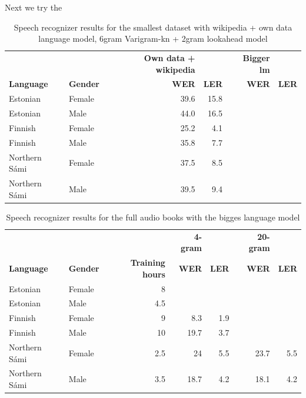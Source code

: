 \documentclass[b5paper]{article}
\newcommand{\ns}{{Northern Sámi }}
\begin{document}
Next we try the 

\begin{table}[!h]
\centering
\begin{tabular}{llrrrr}
 & & \textbf{Own data + wikipedia} & & \textbf{Bigger lm}\\
\textbf{Language} & \textbf{Gender} & \textbf{WER} & \textbf{LER}& \textbf{{WER}} & \textbf{LER}\\\hline
Estonian & Female & 39.6 & 15.8  & & \\
Estonian & Male & 44.0 & 16.5& & \\
Finnish & Female & 25.2 &4.1& &  \\
Finnish & Male &  35.8 & 7.7& &  \\
\ns & Female & 37.5 & 8.5 & & \\
\ns & Male & 39.5 & 9.4& &  \\
\end{tabular}
\caption{Speech recognizer results for the smallest dataset with wikipedia + own data language model, 6gram Varigram-kn + 2gram lookahead model \label{tbl:resultssmallcomp}}
\end{table}




\begin{table}[!h]
\centering
\begin{tabular}{llrrrrr}
& & & \textbf{4-gram} & & \textbf{20-gram} &\\
\textbf{Language} & \textbf{Gender} & \textbf{Training hours} & \textbf{WER} & \textbf{LER}& \textbf{{WER}} & \textbf{LER}\\\hline
Estonian & Female & 8 &  &  \\
Estonian & Male & 4.5 &  &   &  & \\
Finnish & Female & 9  & 8.3 & 1.9  &  & \\
Finnish & Male & 10  & 19.7 & 3.7  &  &  \\
\ns & Female & 2.5  & 24 & 5.5  & 23.7  & 5.5 \\
\ns & Male & 3.5   & 18.7 & 4.2  & 18.1  & 4.2 \\
\end{tabular}
\caption{Speech recognizer results for the full audio books with the bigges language model \label{tbl:resultbigcomp}}
\end{table}
\end{document}
